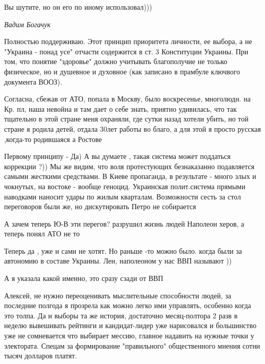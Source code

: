 \begin{itemize}
Вы шутите, но он его по иному использовал)))

\emph{Вадим Богачук}

Полностью поддерживаю. Этот принцип приоритета личности, ее выбора, а не
"Украина - понад усе" отчасти содержится в ст. 3 Конституции Украины. При том,
что понятие "здоровье" должно учитывать благополучие не только физическое, но и
душевное и духовное (как записано в прамбуле ключвого документа ВООЗ).



Согласна, сбежав от АТО, попала в Москву, было воскресенье, многолюдн. на Кр. пл, наша
невойна и там дает о себе знать, приятно удивилась, что так тщательно в этой
стране меня охраняли, где сутки назад хотели убить, но той стране я родила
детей, отдала 30лет работы во благо, а для этой я просто русская ,когда-то
родившаяся а Ростове


Первому принципу - Да) А вы думаете , такая система может поддаться коррекции
?)) Мы же видим, что воля протестующих безнаказанно подавляется самыми жесткими
средствами. В Киеве пропаганда, в результате - много злых и чокнутых, на
востоке - вообще геноцид. Украинская полит.система прямыми наводками наносит
удары по жилым кварталам. Возможности сесть за стол переговоров были же, но
дискутировать Петро не собирается


А зачем теперь Ю-В эти перегов? разрушил жизнь людей Наполеон херов, а теперь
понял АТО не то


Теперь да , уже и сами не хотят. Но раньше -то можно было. когда были за
автономию в составе Украины. Лен, наполеоном у нас ВВП называют ))


А я указала какой именно, это сразу сзади от ВВП


Алексей, не нужно переоценивать мыслительные способности людей, за последние
полгода я прозрела как можно легко ими управлять, особенно когда это толпа. Да
и выборы та же история, достаточно месяц-полтора 2 разв в неделю вывешивать
рейтинги и кандидат-лидер уже нарисовался и большинство уже не сомневается что
выбирает мессию, главное надавить на нужные точки у электората. Спецам за
формирование "правильного" общественного мнения сотни тысяч долларов платят.


\end{itemize}
